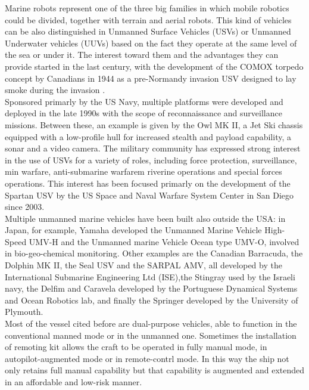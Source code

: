 \documentclass[journal]{IEEEtran}
\begin{document}
      Marine robots represent one of the three big families in which mobile robotics could be divided, together with terrain and aerial robots. This kind of vehicles can be also distinguished in Unmanned Surface Vehicles (USVs) or Unmanned Underwater vehicles (UUVs) based on the fact they operate at the same level of the sea or under it.
      The interest toward them and the advantages they can provide started in the last century, with the development of the COMOX torpedo concept by Canadians in 1944 as a pre-Normandy invasion USV designed to lay smoke during the invasion \cite{Bertram2008}.\\
      \indent Sponsored primarly by the US Navy, multiple platforms were developed and deployed in the late 1990s with the scope of reconnaissance and surveillance missions. Between these, an example is given by the Owl MK II, a Jet Ski chassis equipped with a low-profile hull for increased stealth and payload capability, a sonar and a video camera. The military community has expressed strong interest in the use of USVs for a variety of roles, including force protection, surveillance, min warfare, anti-submarine warfarem riverine operations and special forces operations. This interest has been focused primarly on the development of the Spartan USV by the US Space and Naval Warfare System Center in San Diego since 2003. \\
      \indent Multiple unmanned marine vehicles have been built also outside the USA: in Japan, for example, Yamaha developed the Unmanned Marine Vehicle High-Speed UMV-H and the Unmanned marine Vehicle Ocean type UMV-O, involved in bio-geo-chemical monitoring. Other examples are the Canadian Barracuda, the Dolphin MK II, the Seal USV and the SARPAL AMV, all developed by the International Submarine Engineering Ltd (ISE),the Stingray used by the Israeli navy, the Delfim and Caravela developed by the Portuguese Dynamical Systems and Ocean Robotics lab, and finally the Springer developed by the University of Plymouth.\\
      \indent Most of the vessel cited before are dual-purpose vehicles, able to function in the conventional manned mode or in the unmanned one. Sometimes the installation of remoting kit allows the craft to be operated in fully manual mode, in autopilot-augmented mode or in remote-contrl mode. In this way the ship not only retains full manual capability but that capability is augmented and extended in an affordable and low-risk manner.\\
\end{document}
